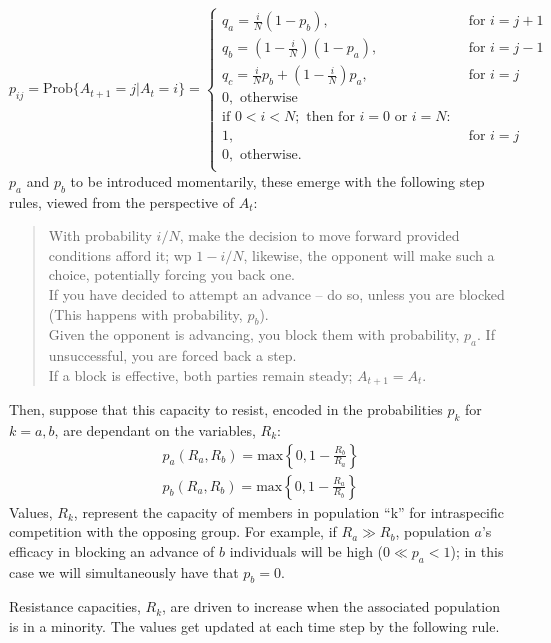 $$
p_{ij} = \text{Prob}\{A_{t+1} = j | A_{t} = i\} =
\begin{cases}
q_a = \frac{i}{N}(1-p_b), & \text{ for } i = j+1\\
q_b = \left( 1 - \frac{i}{N}\right) (1-p_a), & \text{ for } i = j - 1\\
q_c = \frac{i}{N}p_b + \left( 1 - \frac{i}{N}\right) p_a, & \text{ for } i = j\\
0, \text{ otherwise}\\
\text{if } 0 < i < N; \text{ then for } i =0 \text{ or }i = N:\\
1, & \text{ for } i = j\\
0, \text{ otherwise.}\\
\end{cases}
$$
$p_a$ and $p_b$ to be introduced momentarily, these emerge with the following step rules, viewed from the perspective of $A_t$: 
\begin{quotation}
\noindent
With probability $i/N$, make the decision to move forward provided conditions afford it; wp $1-i/N$, likewise, the opponent will make such a choice, potentially forcing you back one.\\

\noindent
If you have decided to attempt an advance -- do so, unless you are blocked (This happens with probability, $p_b$). \\

\noindent
Given the opponent is advancing, you block them with probability, $p_a$. If unsuccessful, you are forced back a step. \\

\noindent
If a block is effective, both parties remain steady; $A_{t+1} = A_t$.
\end{quotation}
Then, suppose that this capacity to resist, encoded in the probabilities $p_k$ for $k = a,b$, are dependant on the variables, $R_k$:
\begin{align*}
p_a(R_a, R_b) = \text{max}\left\{ 0, 1 - \frac{R_b}{R_a}\right\}\\
p_b(R_a, R_b) = \text{max}\left\{ 0, 1 - \frac{R_a}{R_b}\right\}
\end{align*}
Values, $R_k$, represent the capacity of members in population ``k'' for intraspecific competition with the opposing group. For example, if $R_a \gg R_b$, population $a$'s efficacy in blocking an advance of $b$ individuals will be high ($0\ll p_a < 1$); in this case we will simultaneously have that $p_b = 0$. \par
Resistance capacities, $R_k$, are driven to increase when the associated population is in a minority. The values get updated at each time step by the following rule.
